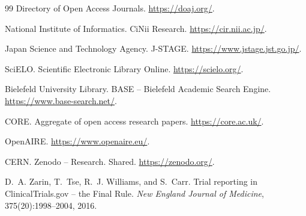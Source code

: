 \documentclass[nonacm,sigconf]{acmart}
\begin{document}
\begin{thebibliography}{99}
Directory of Open Access Journals.
\newblock \url{https://doaj.org/}.

National Institute of Informatics.
\newblock CiNii Research.
\newblock \url{https://cir.nii.ac.jp/}.

Japan Science and Technology Agency.
\newblock J-STAGE.
\newblock \url{https://www.jstage.jst.go.jp/}.

SciELO.
\newblock Scientific Electronic Library Online.
\newblock \url{https://scielo.org/}.

Bielefeld University Library.
\newblock BASE -- Bielefeld Academic Search Engine.
\newblock \url{https://www.base-search.net/}.

CORE.
\newblock Aggregate of open access research papers.
\newblock \url{https://core.ac.uk/}.

OpenAIRE.
\newblock \url{https://www.openaire.eu/}.

CERN.
\newblock Zenodo -- Research. Shared.
\newblock \url{https://zenodo.org/}.

D.~A. Zarin, T.~Tse, R.~J. Williams, and S.~Carr.
\newblock Trial reporting in ClinicalTrials.gov -- the Final Rule.
\newblock \emph{New England Journal of Medicine}, 375(20):1998--2004, 2016.

\end{thebibliography}
\end{document}
